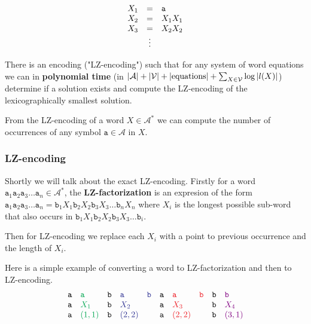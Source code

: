 $$
\begin{array}{r c l}
	X_1 &=& \mathtt{a} \\
	X_2 &=& X_1 X_1 \\
	X_3 &=& X_2 X_2 \\
	&\vdots&
\end{array}
$$

\begin{fact}
	There is an encoding ("LZ-encoding") such that for any system of word equations we can in \textbf{polynomial time} (in $\left|{\mathcal{A}}\right| + \left|{\mathcal{V}}\right| + \left|{\text{equations}}\right| + \sum_{X \in \mathcal{V}} \log |l(X)|$) determine if a solution exists and compute the LZ-encoding of the lexicographically smallest solution.
\end{fact}

\begin{fact}
	From the LZ-encoding of a word $X \in \mathcal{A}^{\ast}$ we can compute the number of occurrences of any symbol $\mathtt{a} \in \mathcal{A}$ in $X$.
\end{fact}

\subsubsection{LZ-encoding}

Shortly we will talk about the exact LZ-encoding. Firstly for a word $\mathtt{a}_1 \mathtt{a}_2 \mathtt{a}_3 \dots \mathtt{a}_n \in \mathcal{A}^\ast$, the \textbf{LZ-factorization} is an expresion of the form $\mathtt{a}_1 \mathtt{a}_2 \mathtt{a}_3 \dots \mathtt{a}_{n} = \mathtt{b}_1 X_1 \mathtt{b}_2 X_2 \mathtt{b}_3 X_3 \dots \mathtt{b}_n X_n$ where $X_i$ is the longest possible sub-word that also occurs in $\mathtt{b}_1 X_1 \mathtt{b}_2 X_2 \mathtt{b}_3 X_3 \dots \mathtt{b}_i$.

Then for LZ-encoding we replace each $X_i$ with a point to previous occurrence and the length of $X_i$.

\begin{example}
	Here is a simple example of converting a word to LZ-factorization and then to LZ-encoding.
	$$
	\begin{array}{l l l l l l l l l l}
		\mathtt{a}&\textcolor{Green}{\mathtt{a}}&\mathtt{b}&\textcolor{Blue}{\mathtt{a}}&\textcolor{Blue}{\mathtt{b}}&\mathtt{a}&\textcolor{Red}{\mathtt{a}}&\textcolor{Red}{\mathtt{b}}&\mathtt{b}&\textcolor{violet}{\mathtt{b}}\\
		\mathtt{a}&\textcolor{Green}{X_1}       &\mathtt{b}&\textcolor{Blue}{X_2}       &                            &\mathtt{a}&\textcolor{Red}{X_3}       &                           &\mathtt{b}&\textcolor{violet}{X_4}\\
		\mathtt{a}&\textcolor{Green}{(1,1)}     &\mathtt{b}&\textcolor{Blue}{(2,2)}     &                            &\mathtt{a}&\textcolor{Red}{(2,2)}     &                           &\mathtt{b}&\textcolor{violet}{(3,1)}\\
	\end{array}
	$$
\end{example}

